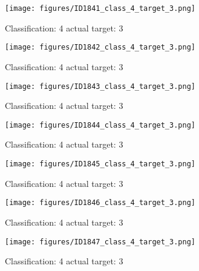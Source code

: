 \begin{figure}[h!]
\begin{center}
\texttt{[image: figures/ID1841\_class\_4\_target\_3.png]}
\end{center}
\caption{ Classification: 4 actual target: 3}
\label{fig:ID1841_class_4_target_3}
\end{figure}
\begin{figure}[h!]
\begin{center}
\texttt{[image: figures/ID1842\_class\_4\_target\_3.png]}
\end{center}
\caption{ Classification: 4 actual target: 3}
\label{fig:ID1842_class_4_target_3}
\end{figure}
\begin{figure}[h!]
\begin{center}
\texttt{[image: figures/ID1843\_class\_4\_target\_3.png]}
\end{center}
\caption{ Classification: 4 actual target: 3}
\label{fig:ID1843_class_4_target_3}
\end{figure}
\begin{figure}[h!]
\begin{center}
\texttt{[image: figures/ID1844\_class\_4\_target\_3.png]}
\end{center}
\caption{ Classification: 4 actual target: 3}
\label{fig:ID1844_class_4_target_3}
\end{figure}
\begin{figure}[h!]
\begin{center}
\texttt{[image: figures/ID1845\_class\_4\_target\_3.png]}
\end{center}
\caption{ Classification: 4 actual target: 3}
\label{fig:ID1845_class_4_target_3}
\end{figure}
\begin{figure}[h!]
\begin{center}
\texttt{[image: figures/ID1846\_class\_4\_target\_3.png]}
\end{center}
\caption{ Classification: 4 actual target: 3}
\label{fig:ID1846_class_4_target_3}
\end{figure}
\begin{figure}[h!]
\begin{center}
\texttt{[image: figures/ID1847\_class\_4\_target\_3.png]}
\end{center}
\caption{ Classification: 4 actual target: 3}
\label{fig:ID1847_class_4_target_3}
\end{figure}
